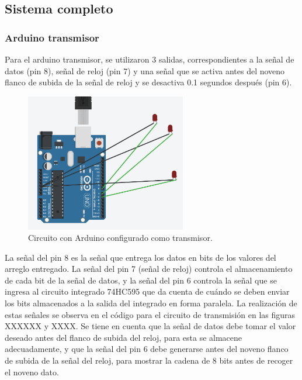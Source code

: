 \documentclass{article}
\begin{document}
\newpage



\subsection{Sistema completo}

\subsubsection{Arduino transmisor}

Para el arduino transmisor, se utilizaron 3 salidas, correspondientes a la señal de datos (pin 8), señal de reloj (pin 7) y una señal que se activa antes del noveno flanco de subida de la señal de reloj y se desactiva 0.1 segundos después (pin 6).\\


\begin{figure}[h]
\includegraphics[width=7cm]{arduino_transmisor.PNG}
\centering
\caption{Circuito con Arduino configurado como transmisor.}
\label{fig:arduino_transmisor.PNG}
\end{figure}

La señal del pin 8 es la señal que entrega los datos en bits de los valores del arreglo entregado. La señal del pin 7 (señal de reloj) controla el almacenamiento de cada bit de la señal de datos, y la señal del pin 6 controla la señal que se ingresa al circuito integrado 74HC595 que da cuenta de cuándo se deben enviar los bits almacenados a la salida del integrado en forma paralela. La realización de estas señales se observa en el código para el circuito de transmisión en las figuras XXXXXX y XXXX. Se tiene en cuenta que la señal de datos debe tomar el valor deseado antes del flanco de subida del reloj, para esta se almacene adecuadamente, y que la señal del pin 6 debe generarse antes del noveno flanco de subida de la señal del reloj, para mostrar la cadena de 8 bits antes de recoger el noveno dato.\\
\end{document}
